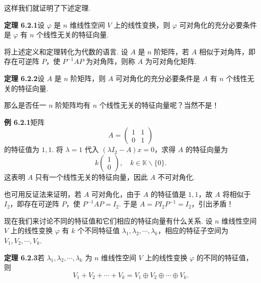 \documentclass[UTF8, 12pt, fontset=fandol, oneside]{ctexart}
\begin{document}
这样我们就证明了下述定理.

\noindent\textbf{定理 6.2.1}\quad 设 $\varphi$ 是 $n$ 维线性空间 $V$ 上的线性变换，则 $\varphi$ 可对角化的充分必要条件是 $\varphi$ 有 $n$ 个线性无关的特征向量.

将上述定义和定理转化为代数的语言. 设 $A$ 是 $n$ 阶矩阵，若 $A$ 相似于对角阵，即存在可逆阵 $P$，使 $P^{-1}AP$ 为对角阵，则称 $A$ 为可对角化矩阵.

\noindent\textbf{定理 6.2.2}\quad 设 $A$ 是 $n$ 阶矩阵，则 $A$ 可对角化的充分必要条件是 $A$ 有 $n$ 个线性无关的特征向量.

那么是否任一 $n$ 阶矩阵均有 $n$ 个线性无关的特征向量呢？当然不是！

\noindent\textbf{例 6.2.1}\quad 矩阵
\[
A=\left(\begin{array}{cc}
1 & 1\\
0 & 1
\end{array}\right)
\]
的特征值为 $1,1$. 将 $\lambda=1$ 代入 $(\lambda I_2-A)x=0$，求得 $A$ 的特征向量为
\[
k\left(\begin{array}{c}
1\\
0
\end{array}\right),\quad k\in\mathbb{K}\backslash\{0\}.
\]
这表明 $A$ 只有一个线性无关的特征向量，因此 $A$ 不可对角化.

也可用反证法来证明，若 $A$ 可对角化，由于 $A$ 的特征值是 $1,1$，故 $A$ 将相似于 $I_2$，即存在可逆阵 $P$，使 $P^{-1}AP=I_2$. 于是 $A=PI_2P^{-1}=I_2$，引出矛盾！

现在我们来讨论不同的特征值和它们相应的特征向量有什么关系. 设 $n$ 维线性空间 $V$ 上的线性变换 $\varphi$ 有 $k$ 个不同特征值 $\lambda_1,\lambda_2,\cdots,\lambda_k$，相应的特征子空间为 $V_1,V_2,\cdots,V_k$.

\noindent\textbf{定理 6.2.3}\quad 若 $\lambda_1,\lambda_2,\cdots,\lambda_k$ 为 $n$ 维线性空间 $V$ 上的线性变换 $\varphi$ 的不同的特征值，则
\[
V_1+V_2+\cdots+V_k=V_1\oplus V_2\oplus\cdots\oplus V_k.
\]
\end{document}
